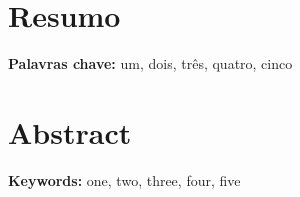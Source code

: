 \documentclass[11pt,a4paper,twoside,openright]{book}
\providecommand{\keywords}[1]{\textbf{Keywords:} #1}
\providecommand{\keywordsP}[1]{\textbf{Palavras chave:} #1}
\begin{document}
\begin{sloppy}


\frontmatter
%
%

\begin{titlepage}

\end{titlepage}


%
%
\clearpage \thispagestyle{empty}\mbox{}\clearpage




%
%
\newpage
\thispagestyle{plain}
\chapter*{Resumo}

\keywordsP{um, dois, três, quatro, cinco}

%
%
\newpage
\thispagestyle{plain}
\chapter*{Abstract}

\keywords{one, two, three, four, five}
%
%
\newpage
\thispagestyle{plain}

\end{sloppy}
\end{document}

